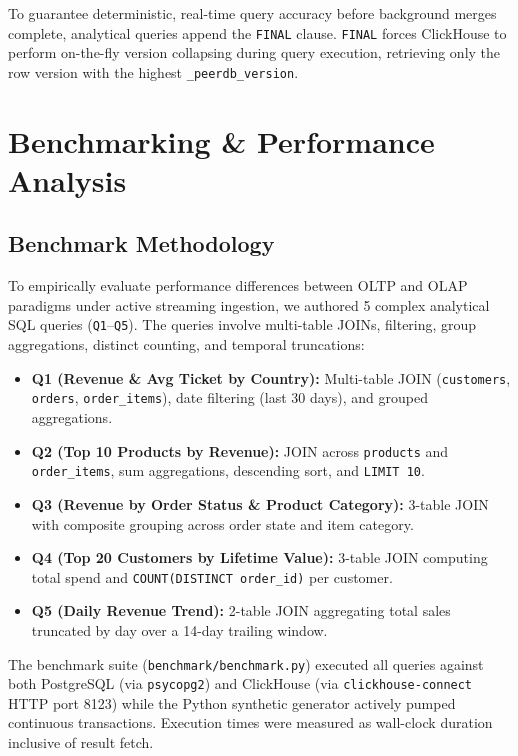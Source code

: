 \documentclass[peerreviewca]{IEEEtran}
\begin{document}
To guarantee deterministic, real-time query accuracy before background merges complete, analytical queries append the \texttt{FINAL} clause. \texttt{FINAL} forces ClickHouse to perform on-the-fly version collapsing during query execution, retrieving only the row version with the highest \texttt{\_peerdb\_version}.

\section{Benchmarking \& Performance Analysis}
\label{sec:benchmark}

\subsection{Benchmark Methodology}
To empirically evaluate performance differences between OLTP and OLAP paradigms under active streaming ingestion, we authored 5 complex analytical SQL queries (\texttt{Q1}--\texttt{Q5}). The queries involve multi-table JOINs, filtering, group aggregations, distinct counting, and temporal truncations:

\begin{itemize}
    \item \textbf{Q1 (Revenue \& Avg Ticket by Country):} Multi-table JOIN (\texttt{customers}, \texttt{orders}, \texttt{order\_items}), date filtering (last 30 days), and grouped aggregations.
    \item \textbf{Q2 (Top 10 Products by Revenue):} JOIN across \texttt{products} and \texttt{order\_items}, sum aggregations, descending sort, and \texttt{LIMIT 10}.
    \item \textbf{Q3 (Revenue by Order Status \& Product Category):} 3-table JOIN with composite grouping across order state and item category.
    \item \textbf{Q4 (Top 20 Customers by Lifetime Value):} 3-table JOIN computing total spend and \texttt{COUNT(DISTINCT order\_id)} per customer.
    \item \textbf{Q5 (Daily Revenue Trend):} 2-table JOIN aggregating total sales truncated by day over a 14-day trailing window.
\end{itemize}

The benchmark suite (\texttt{benchmark/benchmark.py}) executed all queries against both PostgreSQL (via \texttt{psycopg2}) and ClickHouse (via \texttt{clickhouse-connect} HTTP port 8123) while the Python synthetic generator actively pumped continuous transactions. Execution times were measured as wall-clock duration inclusive of result fetch.
\end{document}
